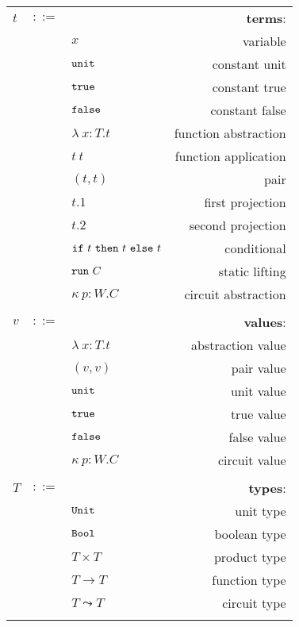 \begin{longtable}[c]{lclr}
  \label{tab:table1}\\
  \toprule
  $t$ &$::=$ &  &\textbf{terms}: \\
      & &$x$ &variable\\
      & &$\mathtt{unit}$ &constant unit\\
      & &$\mathtt{true}$ &constant true\\
      & &$\mathtt{false}$ &constant false\\
      & &$\lambda\ x:T.t$ &function abstraction\\
      & &$t\ t$ &function application\\
      & &$(t, t)$ &pair\\
      & &$t.1$ &first projection\\
      & &$t.2$ &second projection\\
      & &$\tif\ t\ \tthen\ t\ \telse\ t$ &conditional\\
      & &$\trun\ C$ &static lifting\\
      & &$\kappa \ p:W . C$ &circuit abstraction\\
  \\
  
  $v$ &$::=$ &  &\textbf{values}: \\
      & &$\lambda\ x:T.t$ &abstraction value\\
      & &$(v, v)$ &pair value\\
      & &$\mathtt{unit}$ &unit value\\
      & &$\mathtt{true}$ &true value\\
      & &$\mathtt{false}$ &false value\\
      & &$\kappa\ p:W . C$ &circuit value\\
  \\

  $T$ &$::=$ &  &\textbf{types}: \\
      & &$\mathtt{Unit}$ &unit type\\
      & &$\mathtt{Bool}$ &boolean type \\
      & &$T\times T$ &product type\\
      & &$T\to T$ &function type\\
      & &$T\leadsto T$ &circuit type\\
  \\


\end{longtable}
